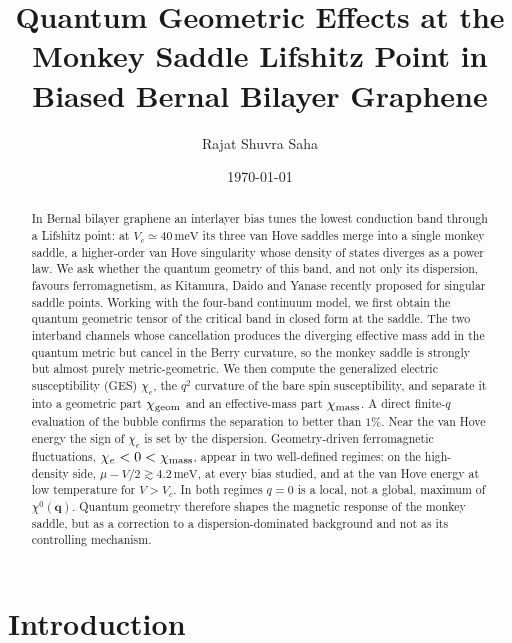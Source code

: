 \documentclass[aps,prb,twocolumn,superscriptaddress,floatfix,nofootinbib]{revtex4-2}
\newcommand{\bq}{\mathbf{q}}
\newcommand{\chie}{\chi_{e}}
\newcommand{\chig}{\chi_{\rm geom}}
\newcommand{\chim}{\chi_{\rm mass}}
\newcommand{\meV}{\,\mathrm{meV}}
\begin{document}
\title{Quantum Geometric Effects at the Monkey Saddle Lifshitz Point in Biased Bernal Bilayer Graphene}

\author{Rajat Shuvra Saha}

\date{\today}

\begin{abstract}
In Bernal bilayer graphene an interlayer bias tunes the lowest conduction band through a Lifshitz point: at $V_c\simeq40\meV$ its three van Hove saddles merge into a single monkey saddle, a higher-order van Hove singularity whose density of states diverges as a power law. We ask whether the quantum geometry of this band, and not only its dispersion, favours ferromagnetism, as Kitamura, Daido and Yanase recently proposed for singular saddle points. Working with the four-band continuum model, we first obtain the quantum geometric tensor of the critical band in closed form at the saddle. The two interband channels whose cancellation produces the diverging effective mass add in the quantum metric but cancel in the Berry curvature, so the monkey saddle is strongly but almost purely metric-geometric. We then compute the generalized electric susceptibility (GES) $\chie$, the $q^2$ curvature of the bare spin susceptibility, and separate it into a geometric part $\chig$ and an effective-mass part $\chim$. A direct finite-$q$ evaluation of the bubble confirms the separation to better than $1\%$. Near the van Hove energy the sign of $\chie$ is set by the dispersion. Geometry-driven ferromagnetic fluctuations, $\chie<0<\chim$, appear in two well-defined regimes: on the high-density side, $\mu-V/2\gtrsim4.2\meV$, at every bias studied, and at the van Hove energy at low temperature for $V>V_c$. In both regimes $q=0$ is a local, not a global, maximum of $\chi^0(\bq)$. Quantum geometry therefore shapes the magnetic response of the monkey saddle, but as a correction to a dispersion-dominated background and not as its controlling mechanism.
\end{abstract}

\maketitle

\section{Introduction}
\end{document}
